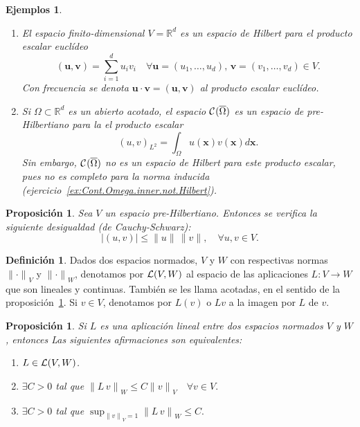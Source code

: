 \documentclass[11pt]{report}
\theoremstyle{plain}
\newtheorem{proposition}[theorem]{Proposición}
\newtheorem{xexample}[theorem]{Ejemplos}
\newenvironment{examples}%
  {\begin{xexample}~\begin{enumerate}}{\end{enumerate}\end{xexample}}
\theoremstyle{definition}
\newtheorem{definition}[theorem]{Definición}
\newcommand{\R}{\ensuremath{\mathbb{R}}}
\newcommand{\xx}{\ensuremath{\mathbf{x}}\xspace}
\newcommand{\uu}{\ensuremath{u}\xspace}
\newcommand{\vv}{\ensuremath{v}\xspace}
\newcommand{\uuu}{\ensuremath{\mathbf{u}}\xspace}
\newcommand{\vvv}{\ensuremath{\mathbf {v}}\xspace}
\newcommand{\abs}[1]{\ensuremath{|#1|}}
\newcommand{\norm}[1]{\ensuremath{\|#1\|}}
\newcommand{\inner}[2]{\ensuremath{\left(#1,#2\right)}}
\newcommand{\classC}[2]{%
  \ensuremath{
   \ifthenelse{\equal{#2}{}}
    {\mathcal{C}^{#1}}
    {\mathcal{C}^{#1}(#2)}
  }
}
\newcommand{\Cont}[1]{\classC{}{#1}}
\newcommand{\Linear}[2]{\ensuremath{\mathcal}{L}(#1,#2)}
\begin{document}
\begin{examples}
    \item El espacio finito-dimensional $V=\R^d$ es  un espacio de Hilbert para el producto escalar euclídeo
    \[
      \inner{\uuu}{\vvv} = \sum_{i=1}^d \uu_i\vv_i \quad\forall\uuu=(u_1,\dots,u_d),\,\vvv=(v_1,\dots,v_d)\in V.
    \]
    Con frecuencia se denota $\uuu\cdot\vvv = \inner{\uuu}{\vvv}$ al producto escalar euclídeo.
    \item 
  Si $\Omega\subset\R^d$ es un abierto acotado, el espacio $\Cont{\overline\Omega}$ es un espacio de pre-Hilbertiano para la el producto escalar
  \begin{equation}
    \label{eq:Cont.Omega.inner}
    \inner{\uu}{\vv}_{L^2} = \int_\Omega \uu(\xx)\vv(\xx) d\xx.
  \end{equation}
  Sin embargo, $\Cont{\overline\Omega}$ no es un espacio de Hilbert para este producto escalar, pues no es completo para la norma inducida (ejercicio~\ref{ex:Cont.Omega.inner.not.Hilbert}).
\end{examples}

\begin{proposition}
 Sea $V$ un espacio pre-Hilbertiano. Entonces se verifica la siguiente desigualdad (de Cauchy-Schwarz):
\begin{equation}
  \label{eq:Cauchy.Schwarz}
  \abs{\inner\uu\vv}\le\norm{\uu}\,\norm{\vv},
  \quad\forall\uu,\vv\in V.
\end{equation} 
\end{proposition}

\begin{definition}
  Dados dos espacios normados, $V$ y $W$ con respectivas normas $\norm\cdot_V$ y $\norm\cdot_W$, denotamos por $\Linear V W$ al espacio de las aplicaciones $L:V\to W$ que son lineales y continuas. También se les llama acotadas, en el sentido de la proposición~\ref{prop:forma.lineal.acotada}. Si $\vv\in V$, denotamos por $L(\vv)$ o $L\vv$ a la imagen por $L$ de $\vv$.
\end{definition}

\begin{proposition}
  \label{prop:forma.lineal.acotada}
  Si $L$ es una aplicación lineal entre dos espacios normados $V$ y $W$, entonces Las siguientes afirmaciones son equivalentes:
  \begin{enumerate}
    \item $L\in\Linear V W$.
    \item $\exists C>0$ tal que
      $\norm{L\,\vv}_W \le C\norm{\vv}_V \quad\forall\vv\in V.$
    \item  $\exists C>0$ tal que $\sup_{\norm{\vv}_V=1}\norm{L\,\vv}_W \le C.$
  \end{enumerate}
\end{proposition}
\end{document}
